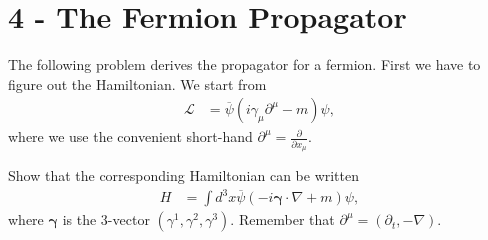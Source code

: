 \documentclass[working, oneside]{../../../Preambles/tuftebook}
\begin{document}
\let\cleardoublepage\clearpage
\thispagestyle{fancy}
\chapter{4 - The Fermion Propagator}
The following problem derives the propagator for a fermion. First we have to figure out the Hamiltonian. We start from
\begin{align*}
\mathcal{L}
&= \overline{\psi} (i \gamma_\mu \partial^\mu - m) \psi, \tag{24}
\end{align*}
where we use the convenient short-hand \( \partial^\mu = \frac{\partial}{\partial x_\mu} \).

\begin{exercise}[1]
Show that the corresponding Hamiltonian can be written
\begin{align*}
H
&= \int d^3x \overline{\psi} (-i \boldsymbol{\gamma} \cdot \nabla + m) \psi, \tag{25}
\end{align*}
where \( \boldsymbol{\gamma} \) is the 3-vector \( (\gamma^1, \gamma^2, \gamma^3) \). Remember that \( \partial^\mu = (\partial_t, -\nabla) \).
\end{exercise}
\end{document}
